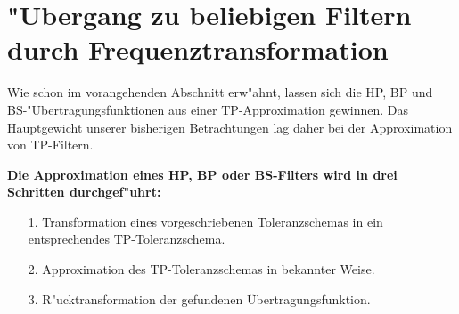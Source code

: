 \section[Frequenztransformationen]
{"Ubergang zu beliebigen Filtern durch Frequenztransformation
\label{Frequtrans}}
Wie schon im vorangehenden Abschnitt erw"ahnt, lassen sich die HP, BP
und BS-"Uber\-tragungs\-funktionen aus einer TP-Approximation gewinnen.
Das Hauptgewicht unserer bisherigen Betrachtungen lag daher bei der
Approximation von TP-Filtern.\\
{\bf Die Approximation eines HP, BP oder BS-Filters wird in drei
  Schritten durchgef"uhrt:
\begin{itemize}
\item[1.] Transformation eines vorgeschriebenen Toleranzschemas in ein
          ent\-spre\-chen\-des TP-Toleranzschema.

\item[2.] Approximation des TP-Toleranzschemas in bekannter Weise.

\item[3.] R"ucktransformation der gefundenen \"Ubertragungsfunktion.
\end{itemize}
}
